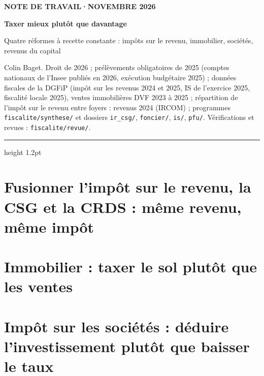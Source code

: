 \documentclass[11pt,a4paper]{article}
\begin{document}
\renewcommand{\figurename}{Figure}\renewcommand{\tablename}{Tableau}

\thispagestyle{empty}
\vspace*{0.6cm}
{\footnotesize\color{ocre}\bfseries NOTE DE TRAVAIL\quad·\quad NOVEMBRE 2026\par}
\vspace{8pt}
{\fontsize{22}{26}\selectfont\bfseries\color{bleu}Taxer mieux plutôt que davantage\par}
\vspace{6pt}
{\large Quatre réformes à recette constante : impôts sur le revenu, immobilier, sociétés, revenus du capital\par}
\vspace{8pt}
{\small Colin Baget. Droit de 2026 ; prélèvements obligatoires de 2025 (comptes nationaux de l'Insee publiés en 2026,
exécution budgétaire 2025) ; données fiscales de la DGFiP (impôt sur les revenus 2024 et 2025, IS de l'exercice 2025,
fiscalité locale 2025), ventes immobilières DVF 2023 à 2025 ; répartition de l'impôt sur le revenu entre foyers : revenus 2024
(IRCOM) ; programmes \texttt{fiscalite/synthese/} et dossiers \texttt{ir\_csg/}, \texttt{foncier/}, \texttt{is/},
\texttt{pfu/}. Vérifications et revues : \texttt{fiscalite/revue/}.\par}
\vspace{6pt}
{\color{bleu}\hrule height 1.2pt}
\vspace{4pt}


\clearpage
{\setcounter{tocdepth}{2}\renewcommand{\contentsname}{Sommaire}\tableofcontents}
\clearpage


\section{Fusionner l'impôt sur le revenu, la CSG et la CRDS : même revenu, même impôt}\label{sec:ircsg}


\section{Immobilier : taxer le sol plutôt que les ventes}\label{sec:foncier}


\section{Impôt sur les sociétés : déduire l'investissement plutôt que baisser le taux}\label{sec:is}

\end{document}
